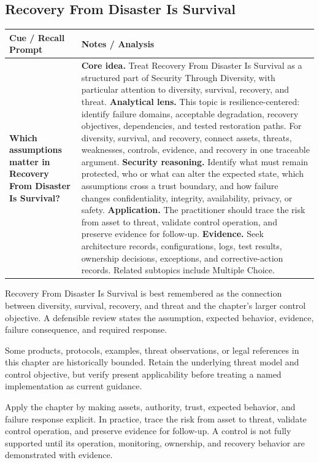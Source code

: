 \documentclass[11pt]{article}
\newcommand{\CornellHeader}{%
\rowcolor{Navy}\color{white}\bfseries Cue / Recall Prompt & \color{white}\bfseries Notes / Analysis\\\hline}
\newcommand{\CornellRow}[2]{%
\cellcolor{CueGray}\RaggedRight\textbf{#1} & \RaggedRight #2\\\hline}
\begin{document}
\subsection*{Recovery From Disaster Is Survival}
\begin{longtable}{>{\RaggedRight\arraybackslash}p{}|>{\RaggedRight\arraybackslash}p{}}
\CornellHeader
\CornellRow{Which assumptions matter in Recovery From Disaster Is Survival?}{\textbf{Core idea.} Treat Recovery From Disaster Is Survival as a structured part of Security Through Diversity, with particular attention to diversity, survival, recovery, and threat. \textbf{Analytical lens.} This topic is resilience-centered: identify failure domains, acceptable degradation, recovery objectives, dependencies, and tested restoration paths. For diversity, survival, and recovery, connect assets, threats, weaknesses, controls, evidence, and recovery in one traceable argument. \textbf{Security reasoning.} Identify what must remain protected, who or what can alter the expected state, which assumptions cross a trust boundary, and how failure changes confidentiality, integrity, availability, privacy, or safety. \textbf{Application.} The practitioner should trace the risk from asset to threat, validate control operation, and preserve evidence for follow-up. \textbf{Evidence.} Seek architecture records, configurations, logs, test results, ownership decisions, exceptions, and corrective-action records. Related subtopics include Multiple Choice.}
\end{longtable}
\begin{topicsummary}
Recovery From Disaster Is Survival is best remembered as the connection between diversity, survival, recovery, and threat and the chapter's larger control objective. A defensible review states the assumption, expected behavior, evidence, failure consequence, and required response.
\end{topicsummary}
\begin{historybox}
Some products, protocols, examples, threat observations, or legal references in this chapter are historically bounded. Retain the underlying threat model and control objective, but verify present applicability before treating a named implementation as current guidance.
\end{historybox}
\begin{defensebox}
Apply the chapter by making assets, authority, trust, expected behavior, and failure response explicit. In practice, trace the risk from asset to threat, validate control operation, and preserve evidence for follow-up. A control is not fully supported until its operation, monitoring, ownership, and recovery behavior are demonstrated with evidence.
\end{defensebox}
\end{document}
